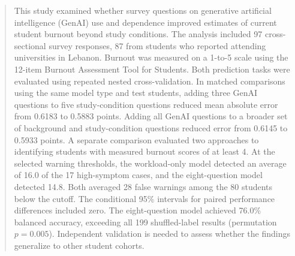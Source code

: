 \begin{abstract}
This study examined whether survey questions on generative artificial intelligence (GenAI) use and dependence improved estimates of current student burnout beyond study conditions.
The analysis included 97 cross-sectional survey responses, 87 from students who reported attending universities in Lebanon.
Burnout was measured on a 1-to-5 scale using the 12-item Burnout Assessment Tool for Students.
Both prediction tasks were evaluated using repeated nested cross-validation.
In matched comparisons using the same model type and test students, adding three GenAI questions to five study-condition questions reduced mean absolute error from 0.6183 to 0.5883 points.
Adding all GenAI questions to a broader set of background and study-condition questions reduced error from 0.6145 to 0.5933 points.
A separate comparison evaluated two approaches to identifying students with measured burnout scores of at least 4.
At the selected warning thresholds, the workload-only model detected an average of 16.0 of the 17 high-symptom cases, and the eight-question model detected 14.8.
Both averaged 28 false warnings among the 80 students below the cutoff. The conditional 95\% intervals for paired performance differences included zero.
The eight-question model achieved 76.0\% balanced accuracy, exceeding all 199 shuffled-label results (permutation \(p=0.005\)).
Independent validation is needed to assess whether the findings generalize to other student cohorts.
\end{abstract}
